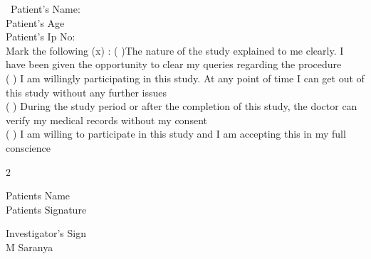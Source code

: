 \documentclass[14pt]{extarticle}
\def\name{M Saranya}
\begin{document}
\
Patient’s Name: \\
Patient’s Age \\
Patient's Ip No: \\


Mark the following (x) :
( )The nature of the study explained to me clearly. I have been given the opportunity to clear my queries regarding the procedure \\
( ) I am willingly participating in this study. At any point of time I can get out of this study without any further issues \\
( ) During the study period or after the completion of this study, the doctor can verify my medical records without my consent \\
( ) I am willing to participate in this study and I am accepting this in my full conscience \\

\vspace{30mm}
\begin{multicols}{2}
    \begin{flushleft}
        Patients Name\\
        Patients Signature
    \end{flushleft}

    \begin{flushleft}
        Investigator's Sign\\
        \name
    \end{flushleft}
\end{multicols}
\end{document}
